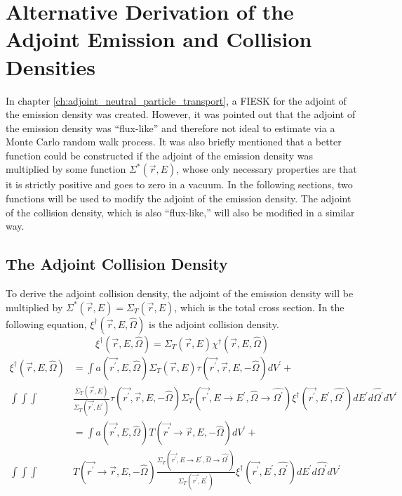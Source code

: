 \chapter{Alternative Derivation of the Adjoint Emission and Collision Densities}
\label{ch:appendix_a}

In chapter \ref{ch:adjoint_neutral_particle_transport}, a FIESK for the adjoint
of the emission density was created. However, it was pointed out that the 
adjoint of the emission density was ``flux-like'' and therefore not ideal to
estimate via a Monte Carlo random walk process. It was also briefly mentioned
that a better function could be constructed if the adjoint of the emission
density was multiplied by some function $\Sigma^{*}(\vec{r},E)$, whose only 
necessary properties are that it is strictly positive and goes to zero in a 
vacuum. In the following sections, two functions will be used to modify the 
adjoint of the emission density. The adjoint of the collision 
density, which is also ``flux-like,'' will also be modified in a similar way.

\section{The Adjoint Collision Density}
\label{sec:adjoint_collision_density}
To derive the adjoint collision density, the adjoint of the emission density
will be multiplied by $\Sigma^{*}(\vec{r},E) = \Sigma_T(\vec{r},E)$, which is 
the total cross section. In the following equation,
$\xi^{\dagger}(\vec{r},E,\hat{\Omega})$ is the adjoint collision density.
\begin{equation}
  \xi^{\dagger}(\vec{r},E,\hat{\Omega}) = \Sigma_T(\vec{r},E)
  \chi^{\dagger}(\vec{r},E,\hat{\Omega})
  \label{eq:adj_collision_dens_to_adjoint_of_emission_dens}
\end{equation}
\begin{align}
  \xi^{\dagger}(\vec{r},E,\hat{\Omega}) & = \int a(\vec{r^{'}},E,\hat{\Omega}) 
  \Sigma_T(\vec{r},E) \tau(\vec{r^{'}},\vec{r},E,-\hat{\Omega}) dV^{'} + 
  \nonumber \\
  \int\int\int  &\frac{\Sigma_T(\vec{r},E)}{\Sigma_T(\vec{r^{'}},E^{'})}
  \tau(\vec{r^{'}},\vec{r},E,-\hat{\Omega}) 
  \Sigma_T(\vec{r^{'}},E \to E^{'},\hat{\Omega} \to \hat{\Omega^{'}})
  \xi^{\dagger}(\vec{r^{'}},E^{'},\hat{\Omega^{'}}) dE^{'}d\hat{\Omega^{'}}dV^{'}
  \nonumber \\
  & = \int a(\vec{r^{'}},E,\hat{\Omega}) 
    T(\vec{r^{'}} \to \vec{r},E,-\hat{\Omega}) dV^{'} + \nonumber \\
    \int\int\int & T(\vec{r^{'}} \to \vec{r},E,-\hat{\Omega})
      \frac{\Sigma_T(\vec{r^{'}},E \to E^{'},\hat{\Omega} \to \hat{\Omega^{'}})}
           {\Sigma_T(\vec{r^{'}},E^{'})}
    \xi^{\dagger}(\vec{r^{'}},E^{'},\hat{\Omega^{'}}) dE^{'}d\hat{\Omega^{'}}dV^{'}
  \nonumber 
\end{align}

